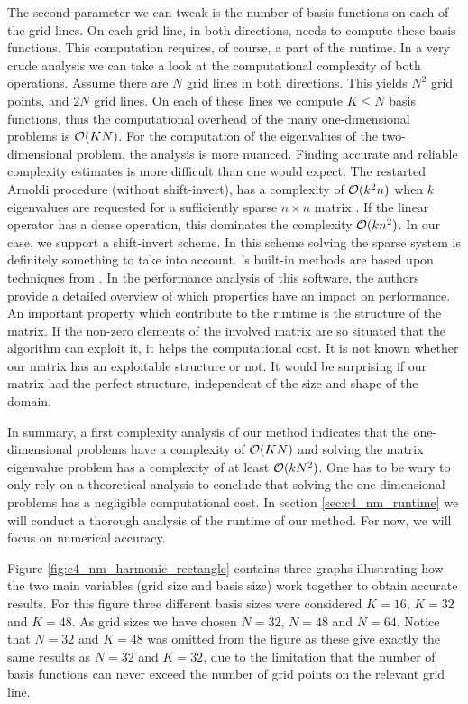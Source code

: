 The second parameter we can tweak is the number of basis functions on each of the grid lines. On each grid line, in both directions, \matslise{} needs to compute these basis functions. This computation requires, of course, a part of the runtime. In a very crude analysis we can take a look at the computational complexity of both operations. Assume there are $N$ grid lines in both directions. This yields $N^2$ grid points, and $2N$ grid lines. On each of these lines we compute $K \leq N$ basis functions, thus the computational overhead of the many one-dimensional problems is $\operatorname{\mathcal{O}}(K N)$. For the computation of the eigenvalues of the two-dimensional problem, the analysis is more nuanced. Finding accurate and reliable complexity estimates is more difficult than one would expect. The restarted Arnoldi procedure (without shift-invert), has a complexity of $\operatorname{\mathcal{O}}(k^2 n)$ when $k$ eigenvalues are requested for a sufficiently sparse $n \times n$ matrix \cite{lee_k2n_2009}. If the linear operator has a dense operation, this dominates the complexity $\operatorname{\mathcal{O}}(k n^2)$. In our case, we support a shift-invert scheme. In this scheme solving the sparse system is definitely something to take into account. \Eigen{}'s built-in methods are based upon techniques from \superlu{} \cite{demmel_supernodal_1999,li_overview_2005}. In the performance analysis of this software, the authors provide a detailed overview of which properties have an impact on performance. An important property which contribute to the runtime is the structure of the matrix. If the non-zero elements of the involved matrix are so situated that the algorithm can exploit it, it helps the computational cost. It is not known whether our matrix has an exploitable structure or not. It would be surprising if our matrix had the perfect structure, independent of the size and shape of the domain.

In summary, a first complexity analysis of our method indicates that the one-dimensional problems have a complexity of $\operatorname{\mathcal{O}}(K N)$ and solving the matrix eigenvalue problem has a complexity of at least $\operatorname{\mathcal{O}}(k N^2)$. One has to be wary to only rely on a theoretical analysis to conclude that solving the one-dimensional problems has a negligible computational cost. In section \ref{sec:c4_nm_runtime} we will conduct a thorough analysis of the runtime of our method. For now, we will focus on numerical accuracy.

Figure \ref{fig:c4_nm_harmonic_rectangle} contains three graphs illustrating how the two main variables (grid size and basis size) work together to obtain accurate results. For this figure three different basis sizes were considered $K = 16$, $K = 32$ and $K = 48$. As grid sizes we have chosen $N = 32$, $N = 48$ and $N=64$. Notice that $N = 32$ and $K = 48$ was omitted from the figure as these give exactly the same results as $N = 32$ and $K = 32$, due to the limitation that the number of basis functions can never exceed the number of grid points on the relevant grid line.

